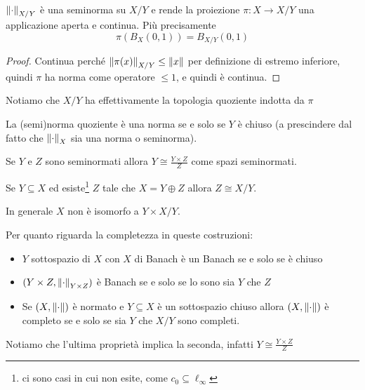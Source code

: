 \begin{exercise}
${\left\Vert{\cdot}\right\Vert}_{X/Y}$ \`e una seminorma su $X/Y$ e rende la proiezione $\pi:X\to X/Y$ una applicazione aperta e continua. Pi\`u precisamente
\[\pi(B_X(0,1))=B_{X/Y}(0,1)\]
\end{exercise}
\begin{proof}
Continua perch\'e $\left\Vert{\pi(x)}\right\Vert_{X/Y}\leq \left\Vert{x}\right\Vert$ per definizione di estremo inferiore, quindi $\pi$ ha norma come operatore $\leq 1$, e quindi \`e continua.
\end{proof}

\begin{remark}
Notiamo che $X/Y$ ha effettivamente la topologia quoziente indotta da $\pi$
\end{remark}

\begin{exercise}
La (semi)norma quoziente \`e una norma se e solo se $Y$ \`e chiuso (a prescindere dal fatto che ${\left\Vert{\cdot}\right\Vert}_X$ sia una norma o seminorma).
\end{exercise}

\begin{remark}
Se $Y$ e $Z$ sono seminormati allora $Y\cong \frac{Y\times Z}Z$ come spazi seminormati.
\end{remark}

\begin{remark}
Se $Y\subseteq X$ ed esiste\footnote{ci sono casi in cui non esite, come $c_0\subseteq \ell_\infty$} $Z$ tale che $X=Y\oplus Z$ allora $Z\cong X/Y$.
\end{remark}

\begin{remark}
In generale $X$ non \`e isomorfo a $Y\times X/Y$.
\end{remark}

\begin{remark}
Per quanto riguarda la completezza in queste costruzioni:
\begin{itemize}
    \item $Y$ sottospazio di $X$ con $X$ di Banach \`e un Banach se e solo se \`e chiuso
    \item $(Y\times Z,{\left\Vert{\cdot}\right\Vert}_{Y\times Z})$ \`e Banach se e solo se lo sono sia $Y$ che $Z$
    \item Se $(X,{\left\Vert{\cdot}\right\Vert})$ \`e normato e $Y\subseteq X$ \`e un sottospazio chiuso allora $(X,{\left\Vert{\cdot}\right\Vert})$ \`e completo se e solo se sia $Y$ che $X/Y$ sono completi.
\end{itemize}
Notiamo che l'ultima propriet\`a implica la seconda, infatti $Y\cong \frac{Y\times Z}Z$
\end{remark}


